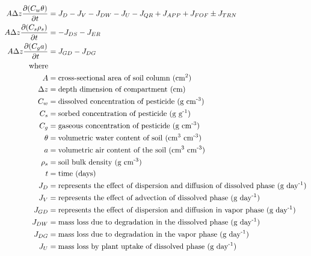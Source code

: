 \documentclass[fleqn, oneside, 11pt]{article}%
\begin{document}
\begin{preview}
\begin{align*}%
A \Delta z \frac{ \partial (C_{w} \theta) }{ \partial t} & = J_{D} - J_{V} - J_{DW} - J_{U} - J_{QR} + J_{APP} + J_{FOF} \pm J_{TRN} \\ 
A \Delta z \frac{ \partial (C_{s} \rho_{s}) }{ \partial t} & = -J_{DS} - J_{ER} \\ 
A \Delta z \frac{ \partial (C_{g} a) }{ \partial t} & = J_{GD} - J_{DG} \\ 
\text{where} \nonumber \\
A & =  \text{cross-sectional area of soil column (cm\textsuperscript {2})} \nonumber \\
\Delta z & =  \text{depth dimension of compartment (cm)} \nonumber \\
C_{w} & =  \text{dissolved concentration of pesticide (g cm\textsuperscript{-3})} \nonumber \\
C_{s} & =  \text{sorbed concentration of pesticide (g g\textsuperscript{-1})} \nonumber \\
C_{g} & =  \text{gaseous concentration of pesticide (g cm\textsuperscript{-3})} \nonumber \\
\theta & =  \text{volumetric water content of soil (cm\textsuperscript{3} cm\textsuperscript{-3})} \nonumber \\
a & =  \text{volumetric air content of the soil (cm\textsuperscript{3} cm\textsuperscript{-3})} \nonumber \\
\rho_{s} & =  \text{soil bulk density (g cm\textsuperscript{-3})} \nonumber \\
t & =  \text{time (days)} \nonumber \\
J_{D} & =  \text{represents the effect of dispersion and diffusion of dissolved phase (g day\textsuperscript{-1})} \nonumber \\
J_{V} & =  \text{represents the effect of advection of dissolved phase (g day\textsuperscript{-1})} \nonumber \\
J_{GD} & =  \text{represents the effect of dispersion and diffusion in vapor phase (g day\textsuperscript{-1})} \nonumber \\
J_{DW} & =  \text{mass loss due to degradation in the dissolved phase (g day\textsuperscript{-1})} \nonumber \\
J_{DG} & =  \text{mass loss due to degradation in the vapor phase (g day\textsuperscript{-1})} \nonumber \\
J_{U} & =  \text{mass loss by plant uptake of dissolved phase (g day\textsuperscript{-1})} \nonumber \\

\end{align*}
\end{preview}
\end{document}
